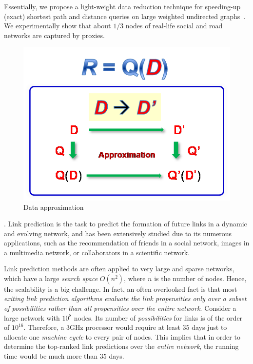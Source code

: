 Essentially, we propose a light-weight data reduction technique for speeding-up (exact)  shortest path and distance queries on large weighted undirected graphs~\cite{MaFLWCH16}. We experimentally show that about $1/3$  nodes of real-life social and road networks  are captured by proxies.



\begin{figure}[tb!]
  \vspace{-1ex}
  \begin{center}
  \includegraphics[scale=0.4]{./dataApprox.png}
  \end{center}
  \vspace{-4ex}
  \caption{Data approximation}\label{fig-tech-dataappro}
  \vspace{-4ex}
\end{figure}

. Link prediction is the task to predict the formation of future links in a dynamic and evolving network, and has been extensively studied due to its numerous applications, such as the recommendation of friends in a social network, images in a multimedia network, or
collaborators in a scientific network.


Link prediction methods are often applied to very large and sparse networks, which have a large {\em search space} $O(n^2)$,
where $n$ is the number of nodes. Hence, the scalability is a big challenge. In fact, an often overlooked fact is that most {\em exiting link prediction algorithms evaluate the link propensities only over a subset of possibilities rather than all propensities over the entire network}. %
Consider a large network with $10^8$ nodes. Its number of {\em possibilities} for links
is of the order of $10^{16}$. Therefore, a 3GHz processor would
require at least $35$ days just to allocate one {\em machine cycle} to
every pair of nodes. This implies that in order to determine the
top-ranked link predictions over the {\em entire network}, the
running time would be much more than $35$ days.

